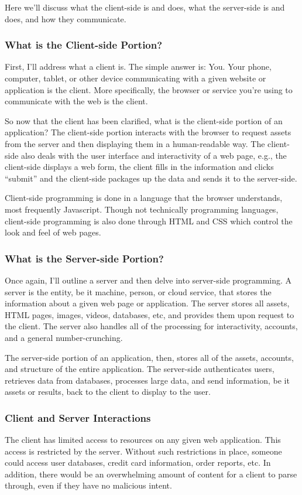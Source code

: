 \documentclass[11pt]{article}
\begin{document}
Here we'll discuss what the client-side is and does, what the server-side is and does, and how they communicate.

\subsubsection{What is the Client-side Portion?}
First, I'll address what a client is. The simple answer is: You. Your phone, computer, tablet, or other device communicating with a given website or application is the client. More specifically, the browser or service you're using to communicate with the web is the client. 

So now that the client has been clarified, what is the client-side portion of an application? The client-side portion interacts with the browser to request assets from the server and then displaying them in a human-readable way. The client-side also deals with the user interface and interactivity of a web page, e.g., the client-side displays a web form, the client fills in the information and clicks ``submit'' and the client-side packages up the data and sends it to the server-side.

Client-side programming is done in a language that the browser understands, most frequently Javascript. Though not technically programming languages, client-side programming is also done through HTML and CSS which control the look and feel of web pages.

\subsubsection{What is the Server-side Portion?}
Once again, I'll outline a server and then delve into server-side programming. A server is the entity, be it machine, person, or cloud service, that stores the information about a given web page or application. The server stores all assets, HTML pages, images, videos, databases, etc, and provides them upon request to the client. The server also handles all of the processing for interactivity, accounts, and a general number-crunching.

The server-side portion of an application, then, stores all of the assets, accounts, and structure of the entire application. The server-side authenticates users, retrieves data from databases, processes large data, and send information, be it assets or results, back to the client to display to the user.

\subsubsection{Client and Server Interactions}
The client has limited access to resources on any given web application. This access is restricted by the server. Without such restrictions in place, someone could access user databases, credit card information, order reports, etc. In addition, there would be an overwhelming amount of content for a client to parse through, even if they have no malicious intent.
\end{document}
